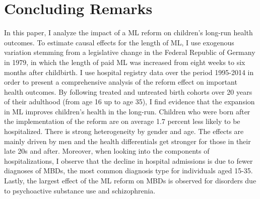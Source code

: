 













\bigskip
\section{Concluding Remarks}\label{sec_mlch:conclusion}

In this paper, I analyze the impact of a ML reform on children's long-run health outcomes. To estimate causal effects for the length of ML, I use exogenous variation stemming from a legislative change in the Federal Republic of Germany in 1979, in which the length of paid ML was increased from eight weeks to six months after childbirth. I use hospital registry data over the period 1995-2014 in order to present a comprehensive analysis of the reform effect on important health outcomes. By following treated and untreated birth cohorts over 20 years of their adulthood (from age 16 up to age 35), I find evidence that the expansion in ML improves children's health in the long-run. Children who were born after the implementation of the reform are on average 1.7 percent less likely to be hospitalized. There is strong heterogeneity by gender and age. The effects are mainly driven by men and the health differentials get stronger for those in their late 20s and after. Moreover, when looking into the components of hospitalizations, I observe that the decline in hospital admissions is due to fewer diagnoses of MBDs, the most common diagnosis type for individuals aged 15-35. Lastly, the largest effect of the ML reform on MBDs is observed for disorders due to psychoactive substance use and schizophrenia.


